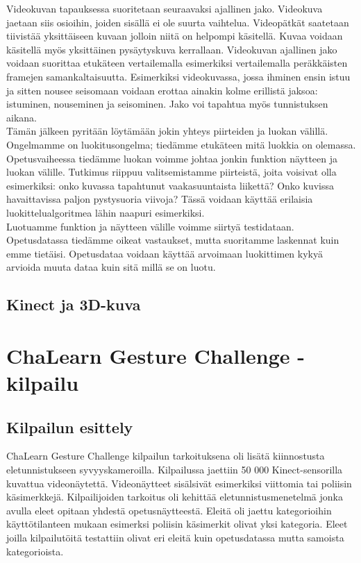 Videokuvan tapauksessa suoritetaan seuraavaksi ajallinen jako. Videokuva jaetaan siis osioihin, joiden sisällä ei ole suurta vaihtelua. 
Videopätkät saatetaan tiivistää yksittäiseen kuvaan jolloin niitä on helpompi käsitellä. Kuvaa voidaan käsitellä myös yksittäinen pysäytyskuva kerrallaan.
Videokuvan ajallinen jako voidaan suorittaa etukäteen vertailemalla esimerkiksi vertailemalla peräkkäisten framejen samankaltaisuutta. Esimerkiksi videokuvassa,
jossa ihminen ensin istuu ja sitten nousee seisomaan voidaan erottaa ainakin kolme erillistä jaksoa: istuminen, nouseminen ja seisominen. 
Jako voi tapahtua myös tunnistuksen aikana.\\

Tämän jälkeen pyritään löytämään jokin yhteys piirteiden ja luokan välillä. Ongelmamme on luokitusongelma; tiedämme etukäteen mitä luokkia on olemassa.
Opetusvaiheessa tiedämme luokan voimme johtaa jonkin funktion näytteen ja luokan välille. 
Tutkimus riippuu valitsemistamme piirteistä, joita voisivat olla esimerkiksi: onko kuvassa tapahtunut vaakasuuntaista liikettä? Onko kuvissa havaittavissa paljon pystysuoria viivoja?
Tässä voidaan käyttää erilaisia luokittelualgoritmea lähin naapuri esimerkiksi.\\

Luotuamme funktion ja näytteen välille voimme siirtyä testidataan. Opetusdatassa tiedämme oikeat vastaukset, mutta suoritamme laskennat kuin emme tietäisi.
Opetusdataa voidaan käyttää arvoimaan luokittimen kykyä arvioida muuta dataa kuin sitä millä se on luotu.\\


\subsection{Kinect ja 3D-kuva}




\section{ChaLearn Gesture Challenge -kilpailu}
\label{ChaLearn Gesture Challenge -kilpailu}

\subsection{Kilpailun esittely}
ChaLearn Gesture Challenge kilpailun tarkoituksena oli lisätä kiinnostusta eletunnistukseen syvyyskameroilla.
Kilpailussa jaettiin 50 000 Kinect-sensorilla kuvattua videonäytettä. Videonäytteet sisälsivät esimerkiksi viittomia
tai poliisin käsimerkkejä. Kilpailijoiden tarkoitus oli kehittää eletunnistusmenetelmä jonka avulla eleet opitaan yhdestä opetusnäytteestä.
Eleitä oli jaettu kategorioihin käyttötilanteen mukaan esimerksi poliisin käsimerkit olivat yksi kategoria. Eleet joilla kilpailutöitä
testattiin olivat eri eleitä kuin opetusdatassa mutta samoista kategorioista.\\

